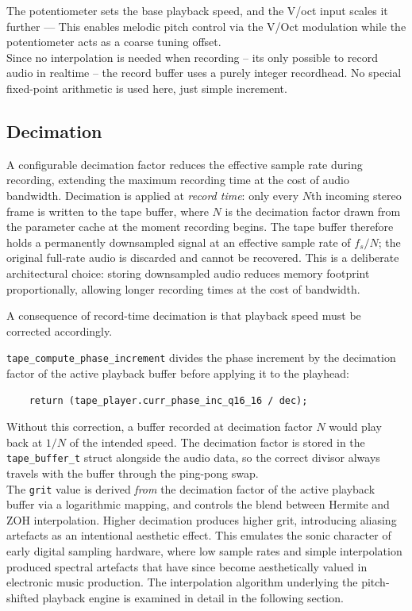 The potentiometer sets the base playback speed, and the V/oct input scales it
further --- This enables melodic pitch control via the V/Oct modulation while the potentiometer acts as a coarse tuning offset. \\

Since no interpolation is needed when recording -- its only possible to record audio in realtime -- the record buffer uses a purely integer recordhead. No special fixed-point arithmetic is used here, just simple increment.

\subsection{Decimation}
\label{sec:tape-player-decimation}
A configurable decimation factor reduces the effective sample rate during recording,
extending the maximum recording time at the cost of audio bandwidth.
Decimation is applied at \emph{record time}: only every $N$th incoming stereo frame
is written to the tape buffer, where $N$ is the decimation factor drawn from the
parameter cache at the moment recording begins.
The tape buffer therefore holds a permanently downsampled signal at an effective
sample rate of $f_s / N$; the original full-rate audio is discarded and cannot be
recovered.
This is a deliberate architectural choice: storing downsampled audio reduces memory
footprint proportionally, allowing longer recording times at the cost of bandwidth.

A consequence of record-time decimation is that playback speed must be corrected
accordingly.

\texttt{tape\_compute\_phase\_increment} divides the phase increment by the
decimation factor of the active playback buffer before applying it to the playhead:

\begin{verbatim}
	return (tape_player.curr_phase_inc_q16_16 / dec);
\end{verbatim}

Without this correction, a buffer recorded at decimation factor $N$ would play back
at $1/N$ of the intended speed.
The decimation factor is stored in the \texttt{tape\_buffer\_t} struct alongside the
audio data, so the correct divisor always travels with the buffer through the
ping-pong swap. \\

The \texttt{grit} value is derived \emph{from} the decimation factor of the active
playback buffer via a logarithmic mapping, and controls the blend between Hermite
and ZOH interpolation.
Higher decimation produces higher grit, introducing aliasing artefacts as an
intentional aesthetic effect.
This emulates the sonic character of early digital sampling hardware, where low
sample rates and simple interpolation produced spectral artefacts that have since
become aesthetically valued in electronic music production.
The interpolation algorithm underlying the pitch-shifted playback engine is examined
in detail in the following section.
